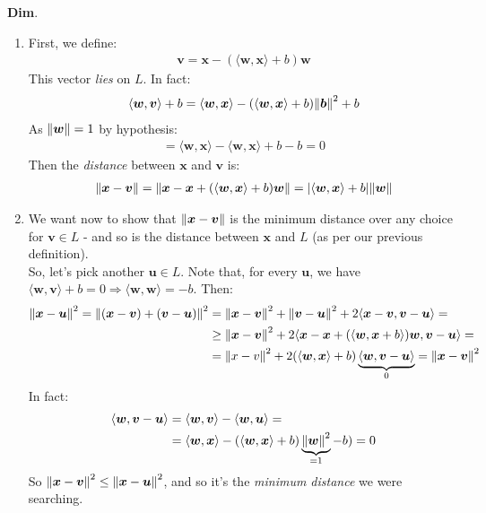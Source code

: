 \documentclass[../template.tex]{subfiles}
\begin{document}
\textbf{Dim}.
\begin{enumerate}
    \item First, we define:
    \begin{align*}
        \bm{v} = \bm{x} - (\langle \bm{w}, \bm{x} \rangle + b) \bm{w}
    \end{align*}
    This vector \textit{lies} on $L$. In fact:
    \begin{align*}
        \langle \bm{w}, \bm{v} \rangle + b = \langle \bm{w}, \bm{x} \rangle - (\langle \bm{w}, \bm{x} \rangle + b) \norm{\bm{b}}^2 + b
    \end{align*}  
    As $\norm{\bm{w}} = 1$ by hypothesis:
    \begin{align*}
        = \langle \bm{w}, \bm{x} \rangle - \langle \bm{w}, \bm{x} \rangle + b - b = 0
    \end{align*}
    Then the \textit{distance} between $\bm{x}$ and $\bm{v}$ is:   
    \begin{align*}
        \norm{\bm{x}- \bm{v}} = \norm{\bm{x} - \bm{x} + (\langle \bm{w}, \bm{x} \rangle + b)\bm{w}} = |\langle \bm{w}, \bm{x} \rangle+b| \norm{\bm{w}}
    \end{align*}
    \item We want now to show that $\norm{\bm{x}-\bm{v}}$ is the minimum distance over any choice for $\bm{v} \in L$ - and so is the distance between $\bm{x}$ and $L$ (as per our previous definition).\\
    So, let's pick another $\bm{u} \in L$. Note that, for every $\bm{u}$, we have $\langle \bm{w}, \bm{v} \rangle + b = 0 \Rightarrow \langle \bm{w}, \bm{w} \rangle = -b$. Then: 
    \begin{align*}
        \norm{\bm{x} - \bm{u}}^2 = \norm{(\bm{x} - \bm{v}) + (\bm{v} - \bm{u})}^2  &= \norm{\bm{x} - \bm{v}}^2 + \norm{\bm{v} - \bm{u}}^2 + 2 \langle \bm{x} - \bm{v}, \bm{v} - \bm{u} \rangle =\\
        & \geq \norm{\bm{x} - \bm{v}}^2 + 2 \langle \bm{x} - \bm{x} + (\langle \bm{w}, \bm{x} + b\rangle)\bm{w}, \bm{v}-\bm{u}  \rangle =\\
        &= \norm{x-v}^2 + 2(\langle \bm{w}, \bm{x} \rangle + b) \underbrace{\langle \bm{w}, \bm{v} - \bm{u} \rangle}_{0}  = \norm{\bm{x}- \bm{v}}^2
    \end{align*}
    In fact:
    \begin{align*}
        \langle \bm{w}, \bm{v} - \bm{u} \rangle &= \langle \bm{w}, \bm{v} \rangle - \langle \bm{w}, \bm{u} \rangle = \\
        &= \langle \bm{w}, \bm{x} \rangle - \left(\langle \bm{w}, \bm{x} \rangle + b\right) \underbrace{\norm{\bm{w}}^2}_{=1}  - b) = 0
    \end{align*}
    So $\norm{\bm{x} - \bm{v}}^2 \leq \norm{\bm{x} - \bm{u}}^2$, and so it's the \textit{minimum distance} we were searching.   
\end{enumerate}
\end{document}
